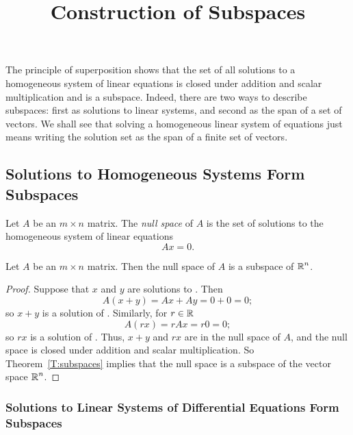 \documentclass{ximera}
\title{Construction of Subspaces}
\begin{document}
\begin{abstract}
\end{abstract}
\maketitle

 \label{S:5.2}

The principle of superposition shows that the set of all
solutions to a homogeneous system of linear equations is closed under 
addition and scalar multiplication and is a
subspace.  Indeed, there are two ways to describe subspaces:
first as solutions to linear systems, and second as the span of
a set of vectors.  We shall see that solving a homogeneous linear system of
equations just means writing the solution set as the span of a
finite set of vectors.

\subsection*{Solutions to Homogeneous Systems Form Subspaces}
 

\begin{definition} \label{D:nullspace}
Let $A$ be an $m\times n$ matrix.  The {\em null space\/} of $A$
is the set of solutions to the homogeneous system of linear equations
\begin{equation} \label{Ax=0}
Ax=0.
\end{equation}
\end{definition} 

\begin{lemma}
Let $A$ be an $m\times n$ matrix.  Then the null space of $A$
is a subspace of $\mbox{$\Bbb{R}$}^n$.
\end{lemma}

\begin{proof}
Suppose that $x$ and $y$ are solutions to .  Then
\[
A(x+y) = Ax+Ay = 0+0 = 0;
\]
so $x+y$ is a solution of .  Similarly, for $r\in\mbox{$\Bbb{R}$}$
\[
A(rx) = rAx = r0 = 0;
\]
so $rx$ is a solution of .  Thus, $x+y$ and $rx$ are
in the null space of $A$, and the null space is closed under addition 
and scalar multiplication.  So Theorem~\ref{T:subspaces} implies that
the null space is a subspace of the vector space $\mbox{$\Bbb{R}$}^n$.   \end{proof}

\subsubsection*{Solutions to Linear Systems of Differential Equations Form
Subspaces}
\end{document}
